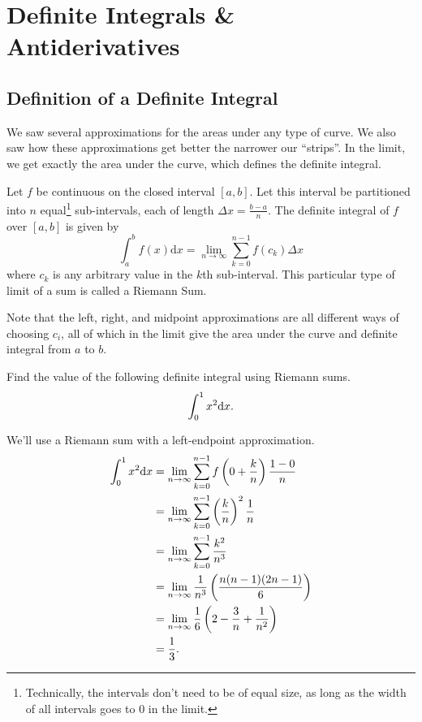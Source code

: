 \section{Definite Integrals \& Antiderivatives}

\subsection{Definition of a Definite Integral}
We saw several approximations for the areas under any type of curve.
We also saw how these approximations get better the narrower our ``strips''.
In the limit, we get exactly the area under the curve, which defines the definite integral.

\begin{definition}
	Let $f$ be continuous on the closed interval $[a,b]$.
	Let this interval be partitioned into $n$ equal\footnote{Technically, the intervals don't need to be of equal size, as long as the width of all intervals goes to 0 in the limit.} sub-intervals, each of length $\Delta x = \frac{b-a}{n}$.
	The definite integral of $f$ over $[a,b]$ is given by
	\begin{equation*}
		\int_{a}^{b}{f(x)\mathrm{d}x} = \lim_{n\to \infty}{\sum_{k=0}^{n-1}{f(c_k)\Delta x}}
	\end{equation*}
	where $c_k$ is any arbitrary value in the $k$th sub-interval.
	This particular type of limit of a sum is called a Riemann Sum.
\end{definition}

Note that the left, right, and midpoint approximations are all different ways of choosing $c_i$, all of which in the limit give the area under the curve and definite integral from $a$ to $b$.

\begin{example}
	Find the value of the following definite integral using Riemann sums.
	\begin{equation*}
		\int_{0}^{1}{x^2\mathrm{d} x}.
	\end{equation*}
\end{example}
\begin{answer}
	We'll use a Riemann sum with a left-endpoint approximation.
	\begin{align*}
		\int_{0}^{1}{x^2\mathrm{d} x} &= \lim_{n\to\infty}{\sum_{k=0}^{n-1}{f\left(0+\frac{k}{n}\right)\frac{1-0}{n}}} \\
		&= \lim_{n\to\infty}{\sum_{k=0}^{n-1}{\left(\frac{k}{n}\right)^2\frac{1}{n}}} \\
		&= \lim_{n\to\infty}{\sum_{k=0}^{n-1}{\frac{k^2}{n^3}}} \\
		&= \lim_{n \to \infty}{\frac{1}{n^3}\left(\frac{n(n-1)(2n-1)}{6}\right)} \\
		&= \lim_{n\to\infty}{\frac{1}{6}\left(2-\frac{3}{n}+\frac{1}{n^2}\right)} \\
		&= \frac{1}{3}.
	\end{align*}
\end{answer}


